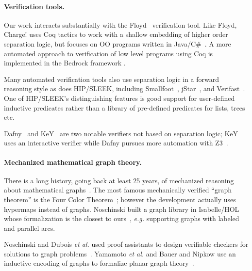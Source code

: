 \vspace{-1ex}
\paragraph{Verification tools.}
Our work interacts substantially with the Floyd~\cite{appel:programlogics} verification 
tool.  Like Floyd, Charge! uses Coq tactics to work with a shallow embedding of higher 
order separation logic, but focuses on OO programs written in 
Java/C\#~\cite{bengtson:charge}.  A  more automated approach to verification of low 
level programs using Coq is implemented in the Bedrock framework \cite{chlipala:bedrock}.

Many automated verification tools also use separation logic in a forward reasoning style 
as does HIP/SLEEK, including Smallfoot~\cite{berdine:smallfoot}, 
jStar~\cite{distefanop08}, and Verifast~\cite{jacobs:verifast}.  One of HIP/SLEEK's 
distinguishing features is good support for user-defined inductive predicates rather 
than a library of pre-defined predicates for lists, trees etc.

Dafny~\cite{leino10} and KeY~\cite{beckert:2007} are two notable verifiers not based 
on separation logic; KeY uses an interactive verifier while Dafny pursues more 
automation with Z3~\cite{moura2008}.

\vspace{-1ex}
\paragraph{Mechanized mathematical graph theory.} There is a long history,
going back at least 25 years, of mechanized reasoning about mathematical
graphs~\cite{wong1991}.  The most famous mechanically verified ``graph theorem''
is the Four Color Theorem~\cite{gonthier2005computer}; however
the development actually uses hypermaps instead of graphs.
Noschinski built a graph library in Isabelle/HOL whose formalization
is the closest to ours~\cite{noschinski2015}, \emph{e.g.} supporting
graphs with labeled and parallel arcs.

Noschinski and Dubois \emph{et al.} used proof assistants to design verifiable
checkers for solutions to graph problems~\cite{noschinski2015formalizing,dubois2015graphes}.
Yamamoto \emph{et al.} and Bauer and Nipkow use an inductive
encoding of graphs to formalize planar graph theory~\cite{yamamoto1995formalization,bauer20025}.




